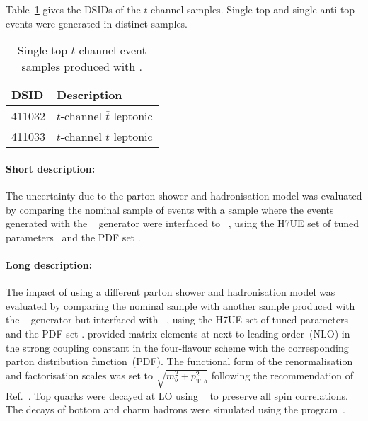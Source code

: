 Table~\ref{tab:tchan_PH7} gives the DSIDs of the $t$-channel \POWHER[7] samples.
Single-top and single-anti-top events were generated in distinct samples.

\begin{table}[htbp]
  \caption{Single-top $t$-channel event samples produced with \POWHER[7].}%
  \label{tab:tchan_PH7}
  \centering
  \begin{tabular}{l l}
    \toprule
    DSID & Description \\
    \midrule
    411032 & $t$-channel $\bar t$ leptonic \\
    411033 & $t$-channel $t$ leptonic \\
    \bottomrule
  \end{tabular}
\end{table}

\paragraph{Short description:}

The uncertainty due to the parton shower and hadronisation model was
evaluated by comparing the nominal sample of events with a sample where
the events generated with the
\POWHEGBOX[v2]~\cite{Frederix:2012dh,Nason:2004rx,Frixione:2007vw,Alioli:2010xd}
generator were interfaced to
\HERWIG[7.04]~\cite{Bahr:2008pv,Bellm:2015jjp}, using the H7UE set
of tuned parameters~\cite{Bellm:2015jjp} and the \MMHT[lo] PDF set
\cite{Harland-Lang:2014zoa}.


\paragraph{Long description:}

The impact of using a different parton shower and hadronisation model was evaluated by comparing the nominal sample
with another sample produced with the \POWHEGBOX[v2]~\cite{Frederix:2012dh,Nason:2004rx,Frixione:2007vw,Alioli:2010xd}
generator but interfaced with \HERWIG[7.04]~\cite{Bahr:2008pv,Bellm:2015jjp}, using the H7UE set of
tuned parameters~\cite{Bellm:2015jjp} and the \MMHT[lo] PDF set \cite{Harland-Lang:2014zoa}.
\POWHEGBOX provided matrix elements at next-to-leading order~(NLO) in the strong coupling constant \alphas
in the four-flavour scheme with the corresponding \NNPDF[3.0nlo]~\cite{Ball:2014uwa} parton distribution function~(PDF).
The functional form of the renormalisation and factorisation scales was set to $\sqrt{m_b^2 + p_{\text{T},b}^2}$
following the recommendation of Ref.~\cite{Frederix:2012dh}.
Top quarks were decayed at LO using \MADSPIN~\cite{Frixione:2007zp,Artoisenet:2012st} to preserve all spin correlations.
The decays of bottom and charm hadrons were simulated using the \EVTGEN[1.6.0] program~\cite{Lange:2001uf}.


